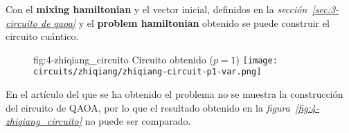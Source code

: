 Con el \textbf{mixing hamiltonian} y el vector inicial, definidos en la \textit{sección~\ref{sec:3-circuito de qaoa}} y el \textbf{problem hamiltonian} obtenido se puede construir el circuito cuántico.

\begin{figure}[htbp]{fig:4-zhiqiang_circuito}{ Circuito obtenido ($p=1$) }
  \centering
  \texttt{[image: circuits/zhiqiang/zhiqiang-circuit-p1-var.png]}
\end{figure}

En el artículo del que se ha obtenido el problema no se muestra la construcción del circuito de QAOA, por lo que el resultado obtenido en la \textit{figura~\ref{fig:4-zhiqiang_circuito}} no puede ser comparado.

